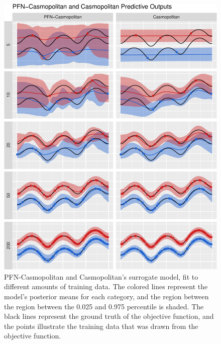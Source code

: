\documentclass[12pt,twoside]{reedthesis}
\begin{document}
\begin{figure}
\centering
\includegraphics{thesis_files/figure-latex/exampleModelFitCasmo-1.pdf}
\caption{\label{fig:exampleModelFitCasmo}PFN-Casmopolitan and Casmopolitan's surrogate model, fit to different amounts of training data. The colored lines represent the model's posterior means for each category, and the region between the region between the 0.025 and 0.975 percentile is shaded. The black lines represent the ground truth of the objective function, and the points illustrate the training data that was drawn from the objective function.}
\end{figure}
\end{document}
